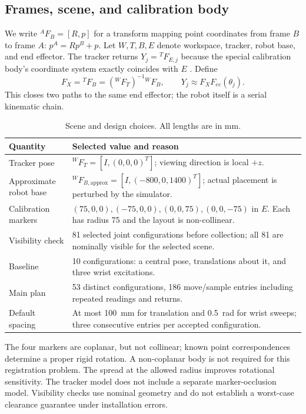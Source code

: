 \documentclass[11pt]{article}
\begin{document}
\subsection{Frames, scene, and calibration body}
We write ${}^{A}F_B=[R,p]$ for a transform mapping point coordinates from frame $B$ to frame $A$: $p^A=Rp^B+p$. Let $W,T,B,E$ denote workspace, tracker, robot base, and end effector. The tracker returns $Y_j={}^{T}F_{E,j}$ because the special calibration body's coordinate system exactly coincides with $E$ \cite{handout,frames}. Define
\begin{equation}
 F_X={}^{T}F_B=({}^{W}F_T)^{-1}{}^{W}F_B,
 \qquad Y_j\approx F_X F_{ee}(\theta_j).
 \label{eq:closure}
\end{equation}
This closes two paths to the same end effector; the robot itself is a serial kinematic chain.

\begin{table}[H]\centering\small
\caption{Scene and design choices. All lengths are in mm.}
\begin{tabularx}{\linewidth}{@{}lY@{}}\toprule
Quantity & Selected value and reason\\\midrule
Tracker pose & ${}^{W}F_T=[I,(0,0,0)^T]$; viewing direction is local $+z$.\\
Approximate robot base & ${}^{W}F_{B,\mathrm{approx}}=[I,(-800,0,1400)^T]$; actual placement is perturbed by the simulator.\\
Calibration markers & $(75,0,0),(-75,0,0),(0,0,75),(0,0,-75)$ in $E$. Each has radius 75 and the layout is non-collinear.\\
Visibility check & 81 selected joint configurations before collection; all 81 are nominally visible for the selected scene.\\
Baseline & 10 configurations: a central pose, translations about it, and three wrist excitations.\\
Main plan & 53 distinct configurations, 186 move/sample entries including repeated readings and returns.\\
Default spacing & At most 100~mm for translation and 0.5~rad for wrist sweeps; three consecutive entries per accepted configuration.\\\bottomrule
\end{tabularx}\end{table}

The four markers are coplanar, but not collinear; known point correspondences determine a proper rigid rotation. A non-coplanar body is not required for this registration problem. The spread at the allowed radius improves rotational sensitivity. The tracker model does not include a separate marker-occlusion model. Visibility checks use nominal geometry and do not establish a worst-case clearance guarantee under installation errors.
\end{document}
